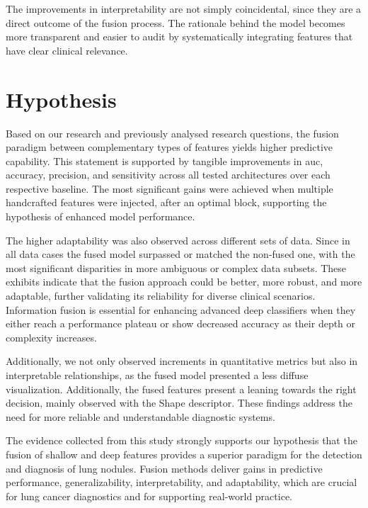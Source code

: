 \begin{enumerate}
The improvements in interpretability are not simply coincidental, since they are a direct outcome of the fusion process. The rationale behind the model becomes more transparent and easier to audit by systematically integrating features that have clear clinical relevance.
\end{enumerate}

\section{Hypothesis}

Based on our research and previously analysed research questions, the fusion paradigm between complementary types of features yields higher predictive capability. This statement is supported by tangible improvements in \ac{auc}, accuracy, precision, and sensitivity across all tested architectures over each respective baseline.
The most significant gains were achieved when multiple handcrafted features were injected, after an optimal block, supporting the hypothesis of enhanced model performance.

The higher adaptability was also observed across different sets of data. Since in all data cases the fused model surpassed or matched the non-fused one, with the most significant disparities in more ambiguous or complex data subsets.
These exhibits indicate that the fusion approach could be better, more robust, and more adaptable, further validating its reliability for diverse clinical scenarios.
Information fusion is essential for enhancing advanced deep classifiers when they either reach a performance plateau or show decreased accuracy as their depth or complexity increases.

Additionally, we not only observed increments in quantitative metrics but also in interpretable relationships, as the fused model presented a less diffuse visualization. Additionally, the fused features present a leaning towards the right decision, mainly observed with the Shape descriptor.
These findings address the need for more reliable and understandable diagnostic systems.

The evidence collected from this study strongly supports our hypothesis that the fusion of shallow and deep features provides a superior paradigm for the detection and diagnosis of lung nodules.
Fusion methods deliver gains in predictive performance, generalizability, interpretability, and adaptability, which are crucial for lung cancer diagnostics and for supporting real-world practice.


